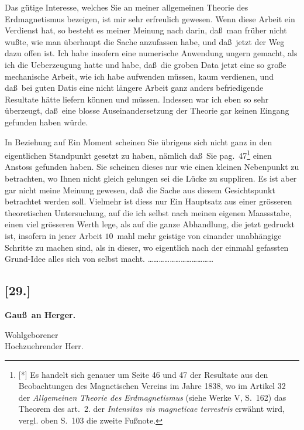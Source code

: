 \documentclass[12pt,a4paper]{article}
\theoremstyle{plain}
\theoremstyle{definition}
\theoremstyle{remark}
\begin{document}
Das g\"utige Interesse, welches Sie an meiner allgemeinen Theorie des
Erdmagnetismus bezeigen, ist mir sehr erfreulich gewesen. Wenn diese
Arbeit ein Verdienst hat, so besteht es meiner Meinung nach darin,
da\ss\ man fr\"uher nicht wu\ss te, wie man \"uberhaupt die Sache
anzufassen habe, und da\ss\ jetzt der Weg dazu offen ist. Ich habe
insofern eine numerische Anwendung ungern gemacht, als ich die
Ueberzeugung hatte und habe, da\ss\ die groben Data jetzt eine so
gro\ss e mechanische Arbeit, wie ich habe aufwenden m\"ussen, kaum
verdienen, und da\ss\ bei guten Datis eine nicht l\"angere Arbeit
ganz anders befriedigende Resultate h\"atte liefern k\"onnen und
m\"ussen. Indessen war ich eben so sehr \"uberzeugt, da\ss\ eine
blosse Auseinandersetzung der Theorie gar keinen Eingang gefunden
haben w\"urde.

In Beziehung auf Ein Moment scheinen Sie \"ubrigens sich nicht ganz
in den eigentlichen Standpunkt gesetzt zu haben, n\"amlich da\ss\ Sie
pag.~47\footnote{[*] Es handelt sich genauer um Seite 46 und 47 der
Resultate aus den Beobachtungen des Magnetischen Vereins im Jahre 1838, wo
im Artikel 32 der {\it Allgemeinen Theorie des Erdmagnetismus} (siehe
Werke V, S.~162) das Theorem des art.~2. der {\it Intensitas vis
magneticae terrestris} erw\"ahnt wird, vergl. oben S.~103 die zweite
Fu\ss note.} einen Anstoss gefunden haben. Sie scheinen dieses nur
wie einen kleinen Nebenpunkt zu betrachten, wo Ihnen nicht gleich
gelungen sei die L\"ucke zu suppliren. Es ist aber gar nicht meine
Meinung gewesen, da\ss\ die Sache aus diesem Gesichtspunkt betrachtet
werden soll. Vielmehr ist diess nur Ein Hauptsatz aus einer
gr\"osseren theoretischen Untersuchung, auf die ich selbst nach meinen
eigenen Maassstabe, einen viel gr\"osseren Werth lege, als auf die
ganze Abhandlung, die jetzt gedruckt ist, insofern in jener Arbeit
$10$~mahl mehr geistige von einander unabh\"angige Schritte zu machen
sind, als in dieser, wo eigentlich nach der einmahl gefassten
Grund-Idee alles sich von selbst macht.
\ldots\ldots\ldots\ldots\ldots\ldots\ldots\ldots\ldots\ldots\ldots\ldots

\subsection*{[29.]}
\begin{center}
\textbf{Gau\ss\ an Herger.}
\end{center}
\begin{center}
Wohlgeborener\\
Hochzuehrender Herr.
\end{center}
\end{document}
